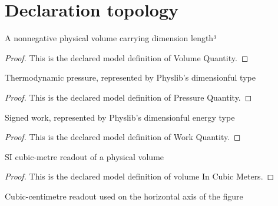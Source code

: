 \section{Declaration topology}
\begin{definition}
  \label{def:physics:phyx-mini-0417:phyxminiproblems-problemphyxmini0417-volumequantity}
  A nonnegative physical volume carrying dimension length³
\end{definition}
\begin{proof}
  This is the declared model definition of Volume Quantity.
\end{proof}
\begin{definition}
  \label{def:physics:phyx-mini-0417:phyxminiproblems-problemphyxmini0417-pressurequantity}
  Thermodynamic pressure, represented by Physlib's dimensionful type
\end{definition}
\begin{proof}
  This is the declared model definition of Pressure Quantity.
\end{proof}
\begin{definition}
  \label{def:physics:phyx-mini-0417:phyxminiproblems-problemphyxmini0417-workquantity}
  Signed work, represented by Physlib's dimensionful energy type
\end{definition}
\begin{proof}
  This is the declared model definition of Work Quantity.
\end{proof}
\begin{definition}
  \label{def:physics:phyx-mini-0417:phyxminiproblems-problemphyxmini0417-volumeincubicmeters}
  SI cubic-metre readout of a physical volume
\end{definition}
\begin{proof}
  This is the declared model definition of volume In Cubic Meters.
\end{proof}
\begin{definition}
  \label{def:physics:phyx-mini-0417:phyxminiproblems-problemphyxmini0417-volumeincubiccentimeters}
  Cubic-centimetre readout used on the horizontal axis of the figure
\end{definition}
